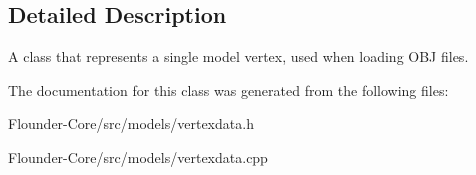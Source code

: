 \subsection{Detailed Description}
A class that represents a single model vertex, used when loading O\+BJ files. 



The documentation for this class was generated from the following files\+:\begin{DoxyCompactItemize}
\item 
Flounder-\/\+Core/src/models/vertexdata.\+h\item 
Flounder-\/\+Core/src/models/vertexdata.\+cpp\end{DoxyCompactItemize}
